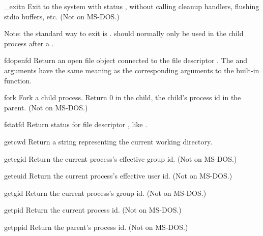 \begin{funcdesc}{_exit}{n}
Exit to the system with status , without calling cleanup
handlers, flushing stdio buffers, etc.
(Not on MS-DOS.)

Note: the standard way to exit is .
 should normally only be used in the child process
after a .
\end{funcdesc}

\begin{funcdesc}{fdopen}{fd}
Return an open file object connected to the file descriptor .
The  and  arguments have the same meaning as
the corresponding arguments to the built-in  function.
\end{funcdesc}

\begin{funcdesc}{fork}{}
Fork a child process.  Return 0 in the child, the child's process id
in the parent.
(Not on MS-DOS.)
\end{funcdesc}

\begin{funcdesc}{fstat}{fd}
Return status for file descriptor , like .
\end{funcdesc}

\begin{funcdesc}{getcwd}{}
Return a string representing the current working directory.
\end{funcdesc}

\begin{funcdesc}{getegid}{}
Return the current process's effective group id.
(Not on MS-DOS.)
\end{funcdesc}

\begin{funcdesc}{geteuid}{}
Return the current process's effective user id.
(Not on MS-DOS.)
\end{funcdesc}

\begin{funcdesc}{getgid}{}
Return the current process's group id.
(Not on MS-DOS.)
\end{funcdesc}

\begin{funcdesc}{getpid}{}
Return the current process id.
(Not on MS-DOS.)
\end{funcdesc}

\begin{funcdesc}{getppid}{}
Return the parent's process id.
(Not on MS-DOS.)
\end{funcdesc}

